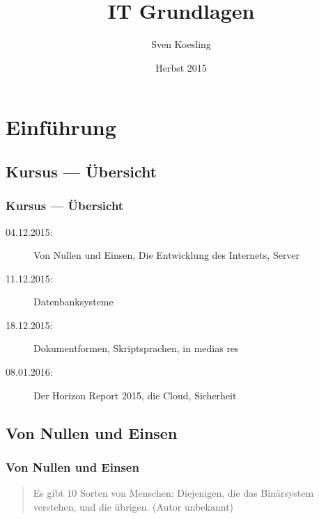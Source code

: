 \usepackage[utf8x]{inputenc}
\usepackage[german]{babel}
\usepackage{float}
\usepackage{courier}
\usepackage{multicol}
\usepackage{listings}
\lstset{inputencoding=utf8x, breaklines=true, basicstyle=\footnotesize\ttfamily}


\title{IT Grundlagen}
\author{Sven Koesling}
\date{Herbst 2015}



\begin{frame}
  \maketitle
\end{frame}


\tableofcontents

	
\section{Einführung}
  \subsection<beamer>{Kursus --- Übersicht}
  \begin{frame}
    \frametitle<beamer>{Kursus --- Übersicht}
    \begin{description}
      \item[04.12.2015: ]Von Nullen und Einsen, Die Entwicklung des Internets, Server
      \item[11.12.2015: ]Datenbanksysteme
      \item[18.12.2015: ]Dokumentformen, Skriptsprachen, in medias res
      \item[08.01.2016: ]Der Horizon Report 2015, die Cloud, Sicherheit
    \end{description}
  \end{frame}

  \subsection{Von Nullen und Einsen}
  \begin{frame}
    \frametitle<beamer>{Von Nullen und Einsen}
      \begin{quote}
        Es gibt 10 Sorten von Menschen: Diejenigen, die das Binärsystem verstehen, und die übrigen. \hfill (Autor unbekannt)
      \end{quote}
  \end{frame}

